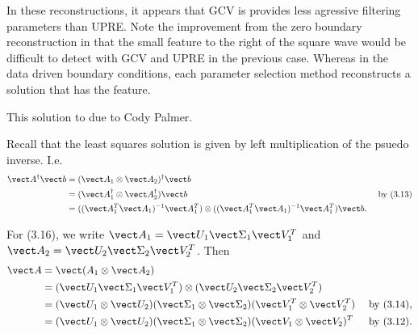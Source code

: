 \documentclass{homework}
\begin{document}
\begin{solution}
\begin{minipage}{.45\textwidth}
\end{minipage} 
\begin{minipage}{.45\textwidth}
In these reconstructions, it appears that GCV is provides less agressive filtering parameters than UPRE.  Note the improvement from the zero boundary reconstruction in that the small feature to the right of the square wave would be difficult to detect with GCV and UPRE in the previous case.  Whereas in the data driven boundary conditions, each parameter selection method reconstructs a solution that has the feature.
\end{minipage}

\end{solution}
\newpage
{}
\begin{solution}
This solution to due to Cody Palmer.

Recall that the least squares solution is given by left multiplication of the psuedo inverse.  I.e.
\begin{align*}
  \vect A^\dagger \vect b &= (\vect A_1 \otimes \vect A_2)^\dagger \vect b \\
  &= (\vect A_1^\dagger \otimes \vect A_2^\dagger)\vect b&\text{ by (3.13)}\\
  &= ((\vect A^T_1\vect A_1)^{-1} \vect A_1^T)\otimes((\vect A^T_1\vect A_1)^{-1} \vect A_1^T)\vect b.
\end{align*}

For (3.16), we write $\vect A_1 = \vect U_1\vect \Sigma_1 \vect V_1^T$ and $\vect A_2= \vect U_2\vect \Sigma_2 \vect V_2^T$.  Then
\begin{align*}
  \vect A &= \vect(A_1 \otimes \vect A_2) \\
  &= (\vect U_1\vect \Sigma_1 \vect V_1^T)\otimes(\vect U_2\vect \Sigma_2 \vect V_2^T)\\
  &= (\vect U_1 \otimes \vect U_2)(\vect \Sigma_1\otimes \vect \Sigma_2)(\vect V_1^T \otimes \vect V_2^T)&\text{ by (3.14),}\\
  &= (\vect U_1 \otimes \vect U_2)(\vect \Sigma_1\otimes \vect \Sigma_2)(\vect V_1 \otimes \vect V_2)^T&\text{ by (3.12).}
\end{align*} 
\end{solution}
\end{document}
